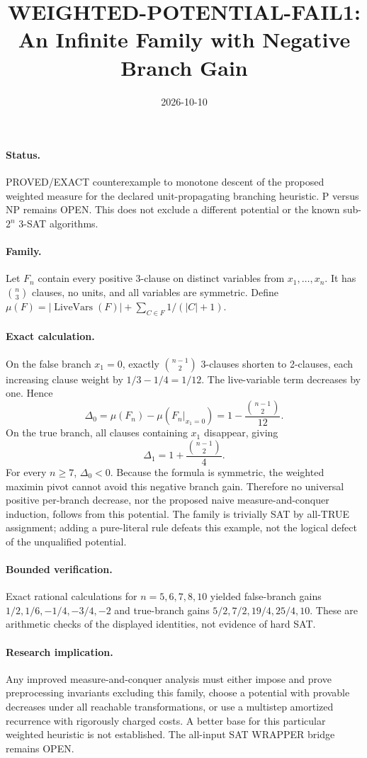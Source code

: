 \documentclass{article}
\begin{document}
\title{WEIGHTED-POTENTIAL-FAIL1: An Infinite Family with Negative Branch Gain}
\date{2026-10-10}\maketitle
\paragraph{Status.} PROVED/EXACT counterexample to monotone descent of the proposed weighted measure for the declared unit-propagating branching heuristic. P versus NP remains OPEN. This does not exclude a different potential or the known sub-$2^n$ 3-SAT algorithms.
\paragraph{Family.} Let $F_n$ contain every positive 3-clause on distinct variables from $x_1,\ldots,x_n$. It has $\binom n3$ clauses, no units, and all variables are symmetric. Define $\mu(F)=|\operatorname{LiveVars}(F)|+\sum_{C\in F}1/(|C|+1)$.
\paragraph{Exact calculation.} On the false branch $x_1=0$, exactly $\binom{n-1}{2}$ 3-clauses shorten to 2-clauses, each increasing clause weight by $1/3-1/4=1/12$. The live-variable term decreases by one. Hence
\[
\Delta_0=\mu(F_n)-\mu(F_n|_{x_1=0})
=1-\frac{\binom{n-1}{2}}{12}.
\]
On the true branch, all clauses containing $x_1$ disappear, giving
\[
\Delta_1=1+\frac{\binom{n-1}{2}}4.
\]
For every $n\ge7$, $\Delta_0<0$. Because the formula is symmetric, the weighted maximin pivot cannot avoid this negative branch gain. Therefore no universal positive per-branch decrease, nor the proposed naive measure-and-conquer induction, follows from this potential. The family is trivially SAT by all-TRUE assignment; adding a pure-literal rule defeats this example, not the logical defect of the unqualified potential.
\paragraph{Bounded verification.} Exact rational calculations for $n=5,6,7,8,10$ yielded false-branch gains $1/2,1/6,-1/4,-3/4,-2$ and true-branch gains $5/2,7/2,19/4,25/4,10$. These are arithmetic checks of the displayed identities, not evidence of hard SAT.
\paragraph{Research implication.} Any improved measure-and-conquer analysis must either impose and prove preprocessing invariants excluding this family, choose a potential with provable decreases under all reachable transformations, or use a multistep amortized recurrence with rigorously charged costs. A better base for this particular weighted heuristic is not established. The all-input SAT WRAPPER bridge remains OPEN.
\end{document}
